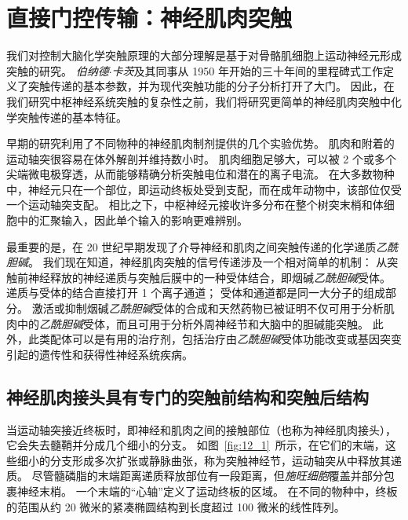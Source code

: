 \chapter{直接门控传输：神经肌肉突触} \label{chap:chap12}


我们对控制大脑化学突触原理的大部分理解是基于对骨骼肌细胞上运动神经元形成突触的研究。
\textit{伯纳德$\cdot$卡茨}及其同事从 1950 年开始的三十年间的里程碑式工作定义了突触传递的基本参数，并为现代突触功能的分子分析打开了大门。
因此，在我们研究中枢神经系统突触的复杂性之前，我们将研究更简单的神经肌肉突触中化学突触传递的基本特征。


早期的研究利用了不同物种的神经肌肉制剂提供的几个实验优势。
肌肉和附着的运动轴突很容易在体外解剖并维持数小时。
肌肉细胞足够大，可以被 2 个或多个尖端微电极穿透，从而能够精确分析突触电位和潜在的离子电流。
在大多数物种中，神经元只在一个部位，即运动终板处受到支配，而在成年动物中，该部位仅受一个运动轴突支配。
相比之下，中枢神经元接收许多分布在整个树突末梢和体细胞中的汇聚输入，因此单个输入的影响更难辨别。


最重要的是，在 20 世纪早期发现了介导神经和肌肉之间突触传递的化学递质\textit{乙酰胆碱}。
我们现在知道，神经肌肉突触的信号传递涉及一个相对简单的机制：
从突触前神经释放的神经递质与突触后膜中的一种受体结合，即烟碱\textit{乙酰胆碱}受体。
递质与受体的结合直接打开 1 个离子通道；
受体和通道都是同一大分子的组成部分。
激活或抑制烟碱\textit{乙酰胆碱}受体的合成和天然药物已被证明不仅可用于分析肌肉中的\textit{乙酰胆碱}受体，而且可用于分析外周神经节和大脑中的胆碱能突触。
此外，此类配体可以是有用的治疗剂，包括治疗由\textit{乙酰胆碱}受体功能改变或基因突变引起的遗传性和获得性神经系统疾病。



\section{神经肌肉接头具有专门的突触前结构和突触后结构}

当运动轴突接近终板时，即神经和肌肉之间的接触部位（也称为神经肌肉接头），它会失去髓鞘并分成几个细小的分支。
如图~\ref{fig:12_1}~所示，在它们的末端，这些细小的分支形成多次扩张或静脉曲张，称为突触神经节，运动轴突从中释放其递质。
尽管髓磷脂的末端距离递质释放部位有一段距离，但\textit{施旺细胞}覆盖并部分包裹神经末梢。
一个末端的“心轴”定义了运动终板的区域。
在不同的物种中，终板的范围从约 20 微米的紧凑椭圆结构到长度超过 100 微米的线性阵列。


